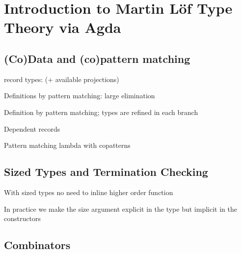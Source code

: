 \chapter{Introduction to Martin L\"of Type Theory via Agda}

\section{(Co)Data and (co)pattern matching}


record types: (+ available projections)


Definitions by pattern matching: large elimination


Definition by pattern matching; types are refined in each branch


Dependent records


Pattern matching lambda with copatterns


\section{Sized Types and Termination Checking}

With sized types no need to inline higher order function


In practice we make the size argument explicit in the type but implicit in the
constructors


\section{Combinators}


